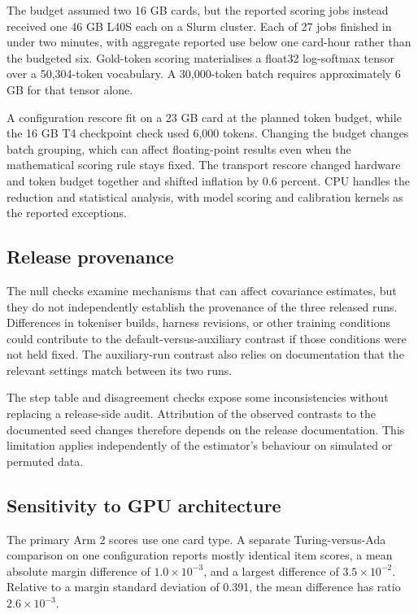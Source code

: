 The budget assumed two 16 GB cards, but the reported scoring jobs instead received one 46 GB L40S each on a Slurm cluster. Each of 27 jobs finished in under two minutes, with aggregate reported use below one card-hour rather than the budgeted six. Gold-token scoring materialises a float32 log-softmax tensor over a 50,304-token vocabulary. A 30,000-token batch requires approximately 6 GB for that tensor alone.

A configuration rescore fit on a 23 GB card at the planned token budget, while the 16 GB T4 checkpoint check used 6,000 tokens. Changing the budget changes batch grouping, which can affect floating-point results even when the mathematical scoring rule stays fixed. The transport rescore changed hardware and token budget together and shifted inflation by 0.6 percent. CPU handles the reduction and statistical analysis, with model scoring and calibration kernels as the reported exceptions.

\subsection{Release provenance}
The null checks examine mechanisms that can affect covariance estimates, but they do not independently establish the provenance of the three released runs. Differences in tokeniser builds, harness revisions, or other training conditions could contribute to the default-versus-auxiliary contrast if those conditions were not held fixed. The auxiliary-run contrast also relies on documentation that the relevant settings match between its two runs.

The step table and disagreement checks expose some inconsistencies without replacing a release-side audit. Attribution of the observed contrasts to the documented seed changes therefore depends on the release documentation. This limitation applies independently of the estimator's behaviour on simulated or permuted data.

\subsection{Sensitivity to GPU architecture}
The primary Arm 2 scores use one card type. A separate Turing-versus-Ada comparison on one configuration reports mostly identical item scores, a mean absolute margin difference of $1.0\times10^{-3}$, and a largest difference of $3.5\times10^{-2}$. Relative to a margin standard deviation of 0.391, the mean difference has ratio $2.6\times10^{-3}$.

